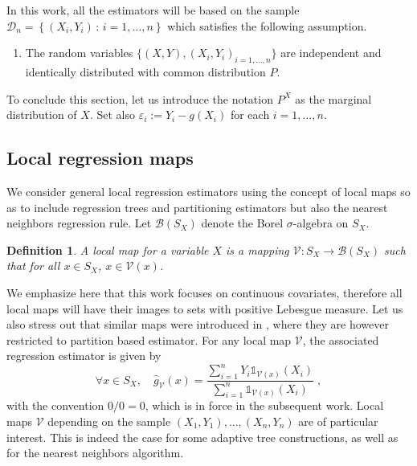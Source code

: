 \documentclass[paper=a4, fontsize=11pt]{scrartcl}
\newtheorem{definition}[theorem]{Definition}
\begin{document}

In this work, all the estimators will be based on the sample $\mathcal{D}_n=\left\{(X_i,Y_i) \,  : \, i=1,\ldots,n\right\}$ which satisfies the following assumption.

\begin{enumerate}[label=(D), wide=0.5em,  leftmargin=*]
\item \label{cond:D} 
The random variables $\{(X,Y), (X_i,Y_i)_ {i=1,\ldots,n} \}$ are independent and identically distributed with common distribution $  P$. 
\end{enumerate}

To conclude this section, let us introduce the notation $P^X$ as the marginal distribution of $X$. Set also $\varepsilon_ i := Y_i - g(X_i) $ for each $i=1,\ldots, n$. 


\subsection{Local regression maps}\label{s22}

We consider general local regression estimators using the concept of local maps so as to include regression trees and partitioning estimators but also the nearest neighbors regression rule. Let $\mathcal B(S_X)$ denote the Borel $\sigma$-algebra on $S_X$.

\begin{definition}
    A local map for a variable $X$ is a mapping $ \mathcal V : S_X \to \mathcal B(S_X) $ such that for all $x\in S_X$, $x\in \mathcal V (x)$. 
\end{definition}

We emphasize here that this work focuses on continuous covariates, therefore all local maps will have their images to sets with positive Lebesgue measure. Let us also stress out that similar maps were introduced in \cite{nobel}, where they are however restricted to partition based estimator.
For any local map $\mathcal V$, the associated regression estimator is given by
\begin{equation*}
    \forall x \in S_X, \quad \hat g_{\mathcal V}(x) = \frac{\sum_{i=1} ^ n Y_i\mathds 1 _{ \mathcal V(x) }(X_i) }{\sum_{i=1} ^ n \mathds 1 _{ \mathcal V(x) }(X_i)  }\; , 
\end{equation*}
with the convention $0/0 = 0$, which is in force in the subsequent work.
Local maps  $\mathcal V $ depending on the sample $(X_1,Y_1),\ldots , (X_n, Y_n)$ are of particular interest. This is indeed the case for some adaptive tree constructions, as well as for the nearest neighbors algorithm.  %
\end{document}
